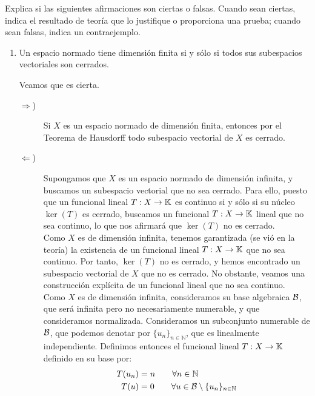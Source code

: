 \documentclass[12pt]{article}
\begin{document}
    \begin{ejercicio}
        Explica si las siguientes afirmaciones son ciertas o falsas. Cuando sean ciertas, indica el resultado de teoría que lo justifique o proporciona una prueba; cuando sean falsas, indica un contraejemplo.
        \begin{enumerate}
            \item Un espacio normado tiene dimensión finita si y sólo si todos sus subespacios vectoriales son cerrados.
            
            Veamos que es cierta.
            \begin{description}
                \item[$\Longrightarrow$)] Si $X$ es un espacio normado de dimensión finita, entonces por el Teorema de Hausdorff todo subespacio vectorial de $X$ es cerrado.
                
                \item[$\Longleftarrow$)] Supongamos que $X$ es un espacio normado de dimensión infinita, y buscamos un subespacio vectorial que no sea cerrado. Para ello, puesto que un funcional lineal $T: X\to \mathbb{K}$ es continuo si y sólo si su núcleo $\ker(T)$ es cerrado, buscamos un funcional $T: X\to \mathbb{K}$ lineal que no sea continuo, lo que nos afirmará que $\ker(T)$ no es cerrado.\\
                
                Como $X$ es de dimensión infinita, tenemos garantizada (se vió en la teoría) la existencia de un funcional lineal $T: X\to \mathbb{K}$ que no sea continuo. Por tanto, $\ker(T)$ no es cerrado, y hemos encontrado un subespacio vectorial de $X$ que no es cerrado. No obstante, veamos una construcción explícita de un funcional lineal que no sea continuo.\\
                
                Como $X$ es de dimensión infinita, consideramos su base algebraica $\mathcal{B}$, que será infinita pero no necesariamente numerable, y que consideramos normalizada. Consideramos un subconjunto numerable de $\mathcal{B}$, que podemos denotar por $\{u_n\}_{n\in \mathbb{N}}$, que es linealmente independiente. Definimos entonces el funcional lineal $T: X\to \mathbb{K}$ definido en su base por:
                \begin{align*}
                    T(u_n) &= n \qquad \forall n\in \mathbb{N}\\
                    T(u) &= 0 \qquad \forall u\in \mathcal{B}\setminus \{u_n\}_{n\in \mathbb{N}}
                \end{align*}


\end{description}
\end{enumerate}
\end{ejercicio}
\end{document}
